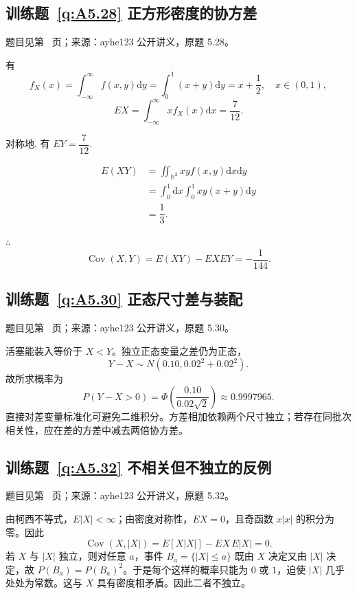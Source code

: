 \documentclass[UTF8,12pt,a4paper,fontset=fandol]{ctexbook}
\begin{document}
\subsection*{训练题~\ref{q:A5.28} 正方形密度的协方差}\label{a:A5.28}{\small 题目见第~\pageref{q:A5.28} 页；来源：ayhe123 公开讲义，原题 5.28。}
\begin{solve}
    有
    \[f_X(x)=\int_{-\infty}^\infty f(x,y)\mathrm{d}y=\int_0^1(x+y)\mathrm{d}y=x+\dfrac{1}{2},\quad x\in(0,1),\]
    \[EX=\int_{-\infty}^\infty xf_X(x)\mathrm{d}x=\dfrac{7}{12}.\]

    对称地, 有 $EY=\dfrac{7}{12}$.

    \[\begin{aligned}E(XY)&=\iint_{\mathbb{R}^2}xyf(x,y)\mathrm{d}x\mathrm{d}y\\&=\int_0^1\mathrm{d}x\int_0^1xy(x+y)\mathrm{d}y\\&=\dfrac{1}{3}.\end{aligned}\]

    $\therefore$
    \[\operatorname{Cov}(X,Y)=E(XY)-EXEY=-\dfrac{1}{144}.\]
\end{solve}

\subsection*{训练题~\ref{q:A5.30} 正态尺寸差与装配}\label{a:A5.30}{\small 题目见第~\pageref{q:A5.30} 页；来源：ayhe123 公开讲义，原题 5.30。}
\begin{solve}活塞能装入等价于 $X<Y$。独立正态变量之差仍为正态，\[Y-X\sim N(0.10,0.02^2+0.02^2).\]故所求概率为\[P(Y-X>0)=\Phi\left(\frac{0.10}{0.02\sqrt2}\right)\approx0.9997965.\]直接对差变量标准化可避免二维积分。方差相加依赖两个尺寸独立；若存在同批次相关性，应在差的方差中减去两倍协方差。\end{solve}

\subsection*{训练题~\ref{q:A5.32} 不相关但不独立的反例}\label{a:A5.32}{\small 题目见第~\pageref{q:A5.32} 页；来源：ayhe123 公开讲义，原题 5.32。}
\begin{solve}由柯西不等式，$E|X|<\infty$；由密度对称性，$EX=0$，且奇函数 $x|x|$ 的积分为零。因此\[\operatorname{Cov}(X,|X|)=E[X|X|]-EX\,E|X|=0.\]若 $X$ 与 $|X|$ 独立，则对任意 $a$，事件 $B_a=\{|X|\le a\}$ 既由 $X$ 决定又由 $|X|$ 决定，故 $P(B_a)=P(B_a)^2$。于是每个这样的概率只能为 $0$ 或 $1$，迫使 $|X|$ 几乎处处为常数。这与 $X$ 具有密度相矛盾。因此二者不独立。\end{solve}
\end{document}
